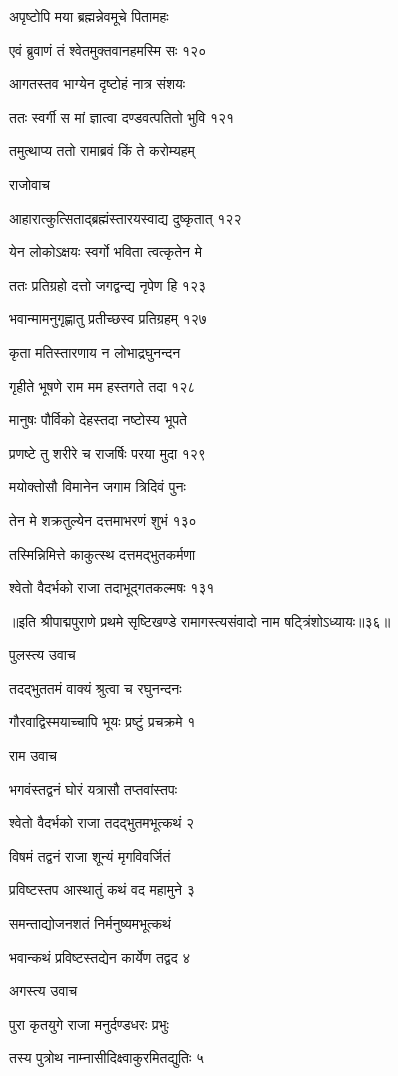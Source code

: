 अपृष्टोपि मया ब्रह्मन्नेवमूचे पितामहः

एवं ब्रुवाणं तं श्वेतमुक्तवानहमस्मि सः १२०

आगतस्तव भाग्येन दृष्टोहं नात्र संशयः

ततः स्वर्गी स मां ज्ञात्वा दण्डवत्पतितो भुवि १२१

तमुत्थाप्य ततो रामाब्रवं किं ते करोम्यहम्

राजोवाच

आहारात्कुत्सिताद्ब्रह्मंस्तारयस्वाद्य दुष्कृतात् १२२

येन लोकोऽक्षयः स्वर्गो भविता त्वत्कृतेन मे

ततः प्रतिग्रहो दत्तो जगद्वन्द्य नृपेण हि १२३

भवान्मामनुगृह्णातु प्रतीच्छस्व प्रतिग्रहम् १२७

कृता मतिस्तारणाय न लोभाद्रघुनन्दन

गृहीते भूषणे राम मम हस्तगते तदा १२८

मानुषः पौर्विको देहस्तदा नष्टोस्य भूपते

प्रणष्टे तु शरीरे च राजर्षिः परया मुदा १२९

मयोक्तोसौ विमानेन जगाम त्रिदिवं पुनः

तेन मे शक्रतुल्येन दत्तमाभरणं शुभं १३०

तस्मिन्निमित्ते काकुत्स्थ दत्तमद्भुतकर्मणा

श्वेतो वैदर्भको राजा तदाभूद्गतकल्मषः १३१ 

॥इति श्रीपाद्मपुराणे प्रथमे सृष्टिखण्डे रामागस्त्यसंवादो नाम षट्त्रिंशोऽध्यायः॥३६॥


पुलस्त्य उवाच

तदद्भुततमं वाक्यं श्रुत्वा च रघुनन्दनः

गौरवाद्विस्मयाच्चापि भूयः प्रष्टुं प्रचक्रमे १

राम उवाच

भगवंस्तद्वनं घोरं यत्रासौ तप्तवांस्तपः

श्वेतो वैदर्भको राजा तदद्भुतमभूत्कथं २

विषमं तद्वनं राजा शून्यं मृगविवर्जितं

प्रविष्टस्तप आस्थातुं कथं वद महामुने ३

समन्ताद्योजनशतं निर्मनुष्यमभूत्कथं

भवान्कथं प्रविष्टस्तद्येन कार्येण तद्वद ४

अगस्त्य उवाच

पुरा कृतयुगे राजा मनुर्दण्डधरः प्रभुः

तस्य पुत्रोथ नाम्नासीदिक्ष्वाकुरमितद्युतिः ५

